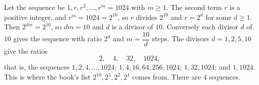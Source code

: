 Let the sequence be $1,r,r^2,\dots,r^m=1024$ with $m\ge1$. The second term $r$ is a positive integer, and $r^m=1024=2^{10}$, so $r$ divides $2^{10}$ and $r=2^d$ for some $d\ge1$. Then $2^{dm}=2^{10}$, so $dm=10$ and $d$ is a divisor of $10$. Conversely each divisor $d$ of $10$ gives the sequence with ratio $2^d$ and $m=\dfrac{10}{d}$ steps. The divisors $d=1,2,5,10$ give the ratios
\[
2,\quad 4,\quad 32,\quad 1024,
\]
that is, the sequences $1,2,4,\dots,1024$; $1,4,16,64,256,1024$; $1,32,1024$; and $1,1024$. This is where the book's list $2^{10},2^5,2^2,2^1$ comes from. There are $\boxed{4}$ sequences.
